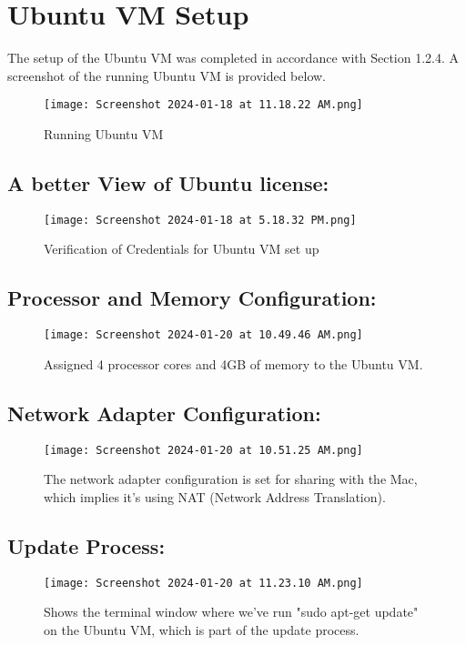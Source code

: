\documentclass{article}
\begin{document}
\newpage
\section{Ubuntu VM Setup}
The setup of the Ubuntu VM was completed in accordance with Section 1.2.4. A screenshot of the running Ubuntu VM is provided below.
\begin{figure}[H]
    \centering
    \texttt{[image: Screenshot 2024-01-18 at 11.18.22 AM.png]}
    \caption{Running Ubuntu VM}
\end{figure}

\subsection{A better View of Ubuntu license:}
\begin{figure}[H]
    \centering
    \texttt{[image: Screenshot 2024-01-18 at 5.18.32 PM.png]}
    \caption{Verification of Credentials for Ubuntu VM set up}
\end{figure}

\subsection{Processor and Memory Configuration:}
\begin{figure}[H]
    \centering
    \texttt{[image: Screenshot 2024-01-20 at 10.49.46 AM.png]}
    \caption{Assigned 4 processor cores and 4GB of memory to the Ubuntu VM.}
\end{figure}

\subsection{Network Adapter Configuration:}
\begin{figure}[H]
    \centering
    \texttt{[image: Screenshot 2024-01-20 at 10.51.25 AM.png]}
    \caption{The network adapter configuration is set for sharing with the Mac, which implies it's using NAT (Network Address Translation).}
\end{figure}

\subsection{Update Process:}
\begin{figure}[H]
    \centering
    \texttt{[image: Screenshot 2024-01-20 at 11.23.10 AM.png]}
    \caption{Shows the terminal window where we've run "sudo apt-get update" on the Ubuntu VM, which is part of the update process.}
\end{figure}
\end{document}
